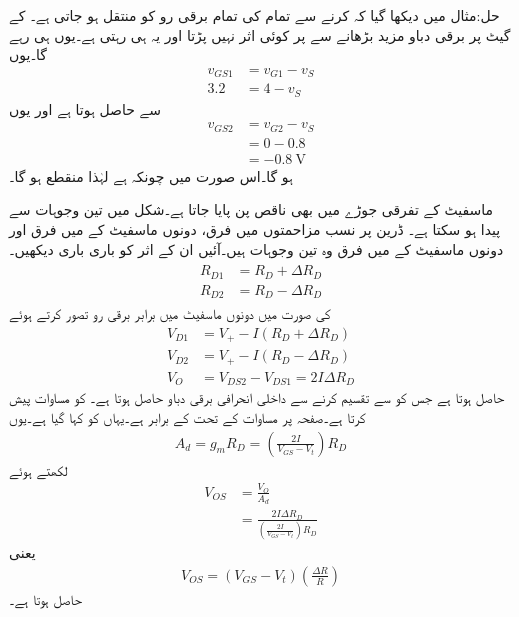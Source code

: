 حل:مثال  میں دیکھا گیا کہ  کرنے سے تمام کی تمام برقی رو  کو منتقل ہو جاتی ہے۔ کے گیٹ پر برقی دباو مزید بڑھانے سے  پر کوئی اثر نہیں پڑتا اور یہ  ہی رہتی ہے۔یوں  ہی رہے گا۔یوں
\begin{align*}
v_{GS1}&=v_{G1}-v_S\\
3.2&=4-v_S
\end{align*}
سے  حاصل ہوتا ہے اور یوں
\begin{align*}
v_{GS2}&=v_{G2}-v_S\\
&=0-0.8\\
&=\SI{-0.8}{\volt}
\end{align*}
ہو گا۔اس صورت میں چونکہ  ہے لہٰذا  منقطع ہو گا۔

ماسفیٹ کے تفرقی جوڑے میں بھی ناقص پن پایا جاتا ہے۔شکل  میں  تین وجوہات سے پیدا ہو سکتا ہے۔ ڈرین پر نسب مزاحمتوں میں فرق، دونوں ماسفیٹ کے  میں فرق اور دونوں ماسفیٹ کے  میں فرق وہ تین وجوہات ہیں۔آئیں ان کے اثر کو باری باری دیکھیں۔
\begin{gather}
\begin{aligned}
R_{D1}&=R_D+\Delta R_D\\
R_{D2}&=R_D-\Delta R_D
\end{aligned}
\end{gather}
کی صورت میں دونوں ماسفیٹ میں برابر برقی رو  تصور کرتے ہوئے
\begin{align*}
V_{D1}&=V_{+}-I \left(R_D+\Delta R_D \right)\\
V_{D2}&=V_{+}-I \left(R_D-\Delta R_D \right)\\
V_O&=V_{DS2}-V_{DS1}=2 I\Delta R_D 
\end{align*}
حاصل ہوتا ہے جس کو  سے تقسیم کرنے سے داخلی انحرافی برقی دباو حاصل ہوتا ہے۔ کو مساوات  پیش کرتا ہے۔صفحہ  پر مساوات  کے تحت  کے برابر ہے۔یہاں   کو  کہا گیا ہے۔یوں
\begin{align*}
A_d=g_m R_D=\left(\frac{2 I}{V_{GS}-V_t}\right) R_D
\end{align*} 
لکھتے ہوئے
\begin{align*}
V_{OS}&=\frac{V_O}{A_d}\\
&=\frac{2 I\Delta R_D }{\left(\frac{2 I}{V_{GS}-V_t}\right) R_D}
\end{align*}
یعنی
\begin{align}
V_{OS}=\left(V_{GS}-V_t \right)\left(\frac{\Delta R}{R}\right)
\end{align}
حاصل ہوتا ہے۔


